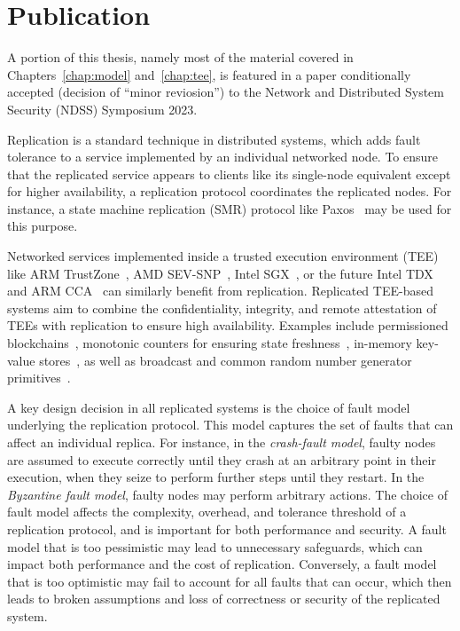 \section{Publication}

A portion of this thesis, namely most of the material covered in
Chapters~\ref{chap:model} and~\ref{chap:tee}, is featured in a
paper conditionally accepted (decision of ``minor reviosion'') to
the Network and Distributed System Security (NDSS) Symposium
2023.



Replication is a standard technique in distributed systems, which adds
fault tolerance to a service implemented by an individual networked
node. To ensure that the replicated service appears to clients like
its single-node equivalent except for higher availability, a
replication protocol coordinates the replicated
nodes. For instance, a state machine replication (SMR) protocol like
Paxos~\cite{paxos} may be used for this purpose.

Networked services implemented inside a trusted execution environment
(TEE) like ARM TrustZone~\cite{armTZ}, AMD SEV-SNP~\cite{amdsev,
  amdsev-snp}, Intel SGX~\cite{intelsgx}, or the future Intel
TDX~\cite{inteltdx} and ARM CCA~\cite{arm-cca} can similarly benefit
from replication.  Replicated \ac{TEE}-based systems aim to combine the
confidentiality, integrity, and remote attestation of \acp{TEE} with
replication to ensure high availability.
Examples include permissioned blockchains~\cite{teechain}, monotonic
counters for ensuring state freshness~\cite{rote}, in-memory key-value
stores~\cite{avocado-atc21}, as well as broadcast and common random
number generator primitives~\cite{p2p-sgx}.

A key design decision in all replicated systems is the choice of fault
model underlying the replication protocol. This model captures the set
of faults that can affect an individual replica.  For instance, in the
{\em crash-fault model}, faulty nodes are assumed to execute correctly
until they crash at an arbitrary point in their execution, when they
seize to perform further steps until they restart. In the {\em
  Byzantine fault model}, faulty nodes may perform arbitrary
actions. The choice of fault model affects the complexity, overhead,
and tolerance threshold of a replication protocol, and is important
for both performance and security. A fault model that is too
pessimistic may lead to unnecessary safeguards, which can impact both
performance and the cost of replication. Conversely, a fault model
that is too optimistic may fail to account for all faults that can
occur, which then leads to broken assumptions and loss of correctness
or security of the replicated system.

